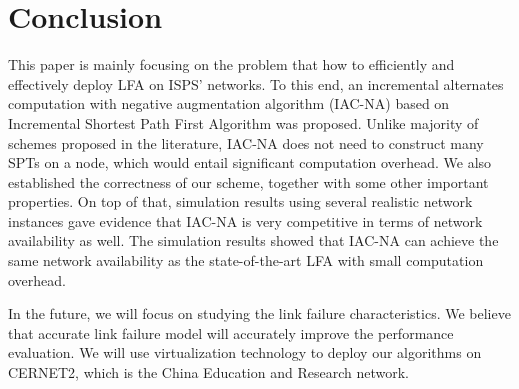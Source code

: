 \section{Conclusion}\label{conclusion}
This paper is mainly focusing on the problem that how to efficiently
and effectively deploy LFA on ISPS' networks.
To this end, an incremental alternates computation with negative augmentation algorithm (IAC-NA) based on Incremental Shortest Path First
Algorithm was proposed.
Unlike majority of
schemes proposed in the literature, IAC-NA does not need to construct many SPTs on a node, which would entail significant computation overhead.
We also established the correctness of our scheme,
together with some other important properties. On top of that,
simulation results using several realistic network instances
gave evidence that IAC-NA  is very competitive in terms of
network availability as well.
The simulation results showed that IAC-NA can achieve
the same network availability as  the state-of-the-art LFA with small computation overhead.

In the future, we will focus on studying the link failure characteristics.
We believe that accurate link failure model will accurately improve  the performance evaluation.
We will use virtualization technology to deploy our algorithms on
CERNET2, which is the China Education and Research network.
